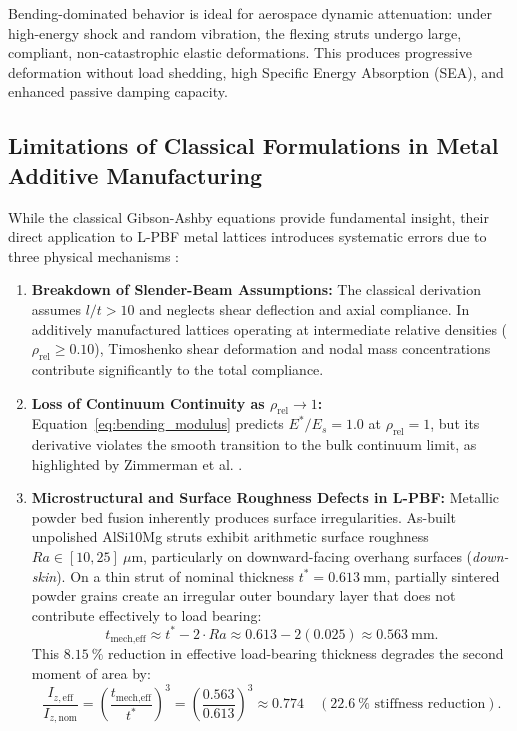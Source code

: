 Bending-dominated behavior is ideal for aerospace dynamic attenuation: under high-energy shock and random vibration, the flexing struts undergo large, compliant, non-catastrophic elastic deformations. This produces progressive deformation without load shedding, high Specific Energy Absorption (SEA), and enhanced passive damping capacity.

\subsection{Limitations of Classical Formulations in Metal Additive Manufacturing}
\label{subsec:gibson_ashby_limitations}

While the classical Gibson-Ashby equations provide fundamental insight, their direct application to L-PBF metal lattices introduces systematic errors due to three physical mechanisms \cite{zhong2023,zimmerman2026}:
\begin{enumerate}
\item \textbf{Breakdown of Slender-Beam Assumptions:} The classical derivation assumes $l/t > 10$ and neglects shear deflection and axial compliance. In additively manufactured lattices operating at intermediate relative densities ($\rho_{\text{rel}} \ge 0.10$), Timoshenko shear deformation and nodal mass concentrations contribute significantly to the total compliance.
\item \textbf{Loss of Continuum Continuity as $\rho_{\text{rel}} \to 1$:} Equation~\eqref{eq:bending_modulus} predicts $E^*/E_s = 1.0$ at $\rho_{\text{rel}} = 1$, but its derivative violates the smooth transition to the bulk continuum limit, as highlighted by Zimmerman et al. \cite{zimmerman2026}.
\item \textbf{Microstructural and Surface Roughness Defects in L-PBF:} Metallic powder bed fusion inherently produces surface irregularities. As-built unpolished AlSi10Mg struts exhibit arithmetic surface roughness $Ra \in [10, 25]\ \mu\text{m}$, particularly on downward-facing overhang surfaces (\textit{down-skin}). On a thin strut of nominal thickness $t^* = \SI{0.613}{\milli\meter}$, partially sintered powder grains create an irregular outer boundary layer that does not contribute effectively to load bearing:
\begin{equation}
t_{\text{mech,eff}} \approx t^* - 2 \cdot Ra \approx 0.613 - 2(0.025) \approx \SI{0.563}{\milli\meter}.
\label{eq:effective_thickness}
\end{equation}
This $\SI{8.15}{\percent}$ reduction in effective load-bearing thickness degrades the second moment of area by:
\begin{equation}
\frac{I_{z,\text{eff}}}{I_{z,\text{nom}}} = \left( \frac{t_{\text{mech,eff}}}{t^*} \right)^3 = \left( \frac{0.563}{0.613} \right)^3 \approx 0.774 \quad (\SI{22.6}{\percent}\text{ stiffness reduction}).
\label{eq:stiffness_loss}
\end{equation}
\end{enumerate}


